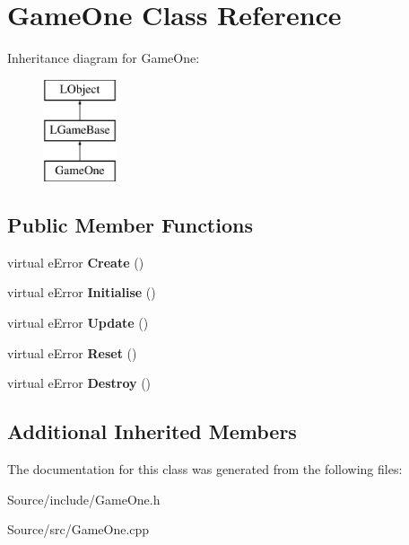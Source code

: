 \hypertarget{class_game_one}{\section{Game\-One Class Reference}
\label{class_game_one}
}
Inheritance diagram for Game\-One\-:\begin{figure}[H]
\begin{center}
\leavevmode
\includegraphics[height=3.000000cm]{class_game_one}
\end{center}
\end{figure}
\subsection*{Public Member Functions}
\begin{DoxyCompactItemize}
\item 
\hypertarget{class_game_one_a76590917f2525e502798d3a8b1916303}{virtual e\-Error {\bfseries Create} ()}\label{class_game_one_a76590917f2525e502798d3a8b1916303}

\item 
\hypertarget{class_game_one_accbd99a0a216c5e2437ffa89d698f356}{virtual e\-Error {\bfseries Initialise} ()}\label{class_game_one_accbd99a0a216c5e2437ffa89d698f356}

\item 
\hypertarget{class_game_one_ac389e6f73fe47ecff5db0b6c5b6b53e1}{virtual e\-Error {\bfseries Update} ()}\label{class_game_one_ac389e6f73fe47ecff5db0b6c5b6b53e1}

\item 
\hypertarget{class_game_one_a51bff7285daf69d4ceffa88313cd9ebf}{virtual e\-Error {\bfseries Reset} ()}\label{class_game_one_a51bff7285daf69d4ceffa88313cd9ebf}

\item 
\hypertarget{class_game_one_a0fb2af6516be1647500dc16ae2610630}{virtual e\-Error {\bfseries Destroy} ()}\label{class_game_one_a0fb2af6516be1647500dc16ae2610630}

\end{DoxyCompactItemize}
\subsection*{Additional Inherited Members}


The documentation for this class was generated from the following files\-:\begin{DoxyCompactItemize}
\item 
Source/include/Game\-One.\-h\item 
Source/src/Game\-One.\-cpp\end{DoxyCompactItemize}

